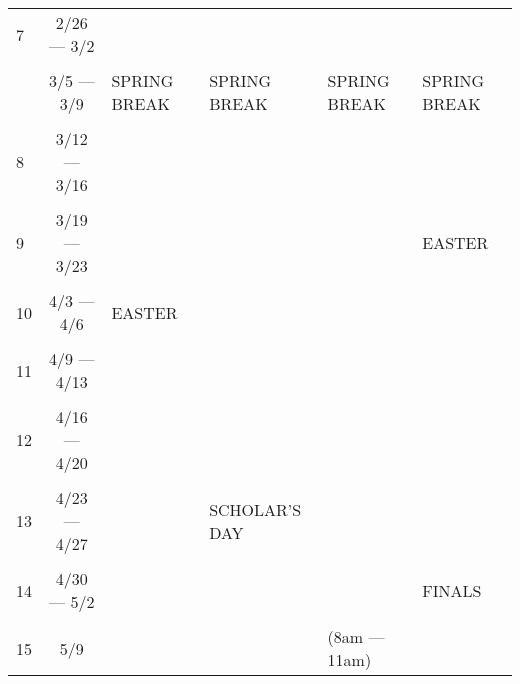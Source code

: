 \documentclass[10pt]{article}
\begin{document}
\begin{landscape}
\begin{center}
\begin{tabular}{lcllll}
7 & 2/26 --- 3/2 &   & & &  \\ \\
  & 3/5 --- 3/9 & SPRING BREAK & SPRING BREAK & SPRING BREAK & SPRING BREAK \\ \\
8 & 3/12 --- 3/16 & & & & \\ \\
9 & 3/19 --- 3/23 &  & & & EASTER \\ \\
10 & 4/3 --- 4/6 & EASTER & & & \\ \\
11 & 4/9 --- 4/13 &  & & & \\ \\
12 & 4/16 --- 4/20 &  & & & \\ \\
13 & 4/23 --- 4/27 & & SCHOLAR'S DAY & &\\ \\
14 & 4/30 --- 5/2 & & & & FINALS\\ \\
15 & 5/9 & &  & (8am --- 11am) & \\
\end{tabular}
\end{center}
\end{landscape}
\restoregeometry
\end{document}
